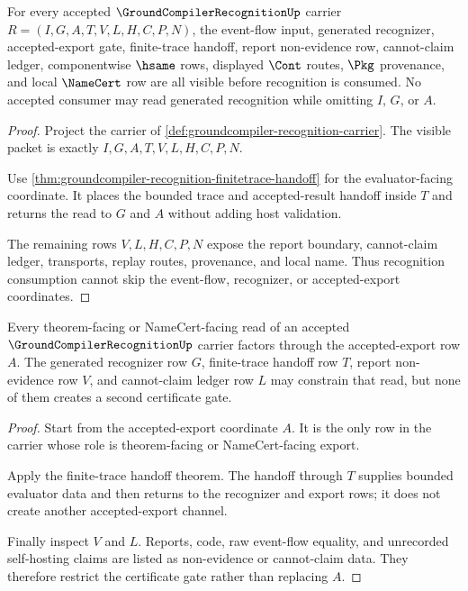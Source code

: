 \begin{theorem}
\label{thm:groundcompiler-recognition-flow-carrier-exposure}
For every accepted $\GroundCompilerRecognitionUp$ carrier $R=(I,G,A,T,V,L,H,C,P,N)$, the event-flow input, generated recognizer, accepted-export gate, finite-trace handoff, report non-evidence row, cannot-claim ledger, componentwise $\hsame$ rows, displayed $\Cont$ routes, $\Pkg$ provenance, and local $\NameCert$ row are all visible before recognition is consumed. No accepted consumer may read generated recognition while omitting $I$, $G$, or $A$.
\end{theorem}
\begin{proof}
Project the carrier of \autoref{def:groundcompiler-recognition-carrier}. The visible packet is exactly $I,G,A,T,V,L,H,C,P,N$.

Use \autoref{thm:groundcompiler-recognition-finitetrace-handoff} for the evaluator-facing coordinate. It places the bounded trace and accepted-result handoff inside $T$ and returns the read to $G$ and $A$ without adding host validation.

The remaining rows $V,L,H,C,P,N$ expose the report boundary, cannot-claim ledger, transports, replay routes, provenance, and local name. Thus recognition consumption cannot skip the event-flow, recognizer, or accepted-export coordinates.
\end{proof}

\begin{theorem}
\label{thm:groundcompiler-recognition-certificate-gate-stability}
Every theorem-facing or NameCert-facing read of an accepted $\GroundCompilerRecognitionUp$ carrier factors through the accepted-export row $A$. The generated recognizer row $G$, finite-trace handoff row $T$, report non-evidence row $V$, and cannot-claim ledger row $L$ may constrain that read, but none of them creates a second certificate gate.
\end{theorem}
\begin{proof}
Start from the accepted-export coordinate $A$. It is the only row in the carrier whose role is theorem-facing or NameCert-facing export.

Apply the finite-trace handoff theorem. The handoff through $T$ supplies bounded evaluator data and then returns to the recognizer and export rows; it does not create another accepted-export channel.

Finally inspect $V$ and $L$. Reports, code, raw event-flow equality, and unrecorded self-hosting claims are listed as non-evidence or cannot-claim data. They therefore restrict the certificate gate rather than replacing $A$.
\end{proof}

